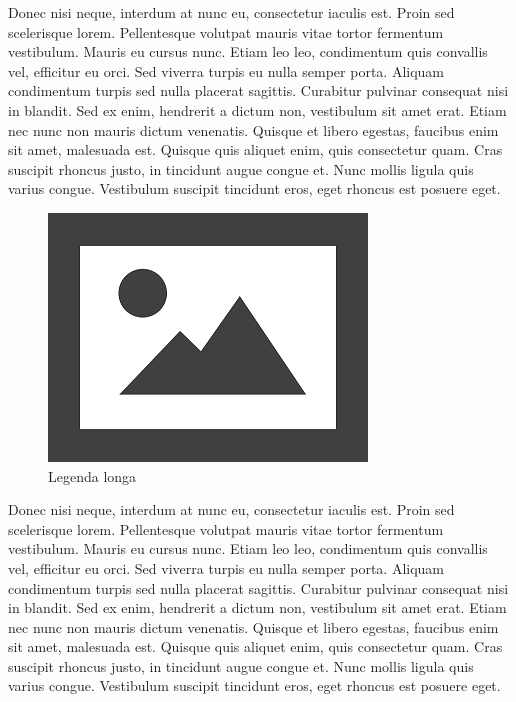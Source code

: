 \documentclass[12pt]{article}
\begin{document}
Donec nisi neque, interdum at nunc eu, consectetur iaculis est. Proin sed scelerisque lorem. Pellentesque volutpat mauris vitae tortor fermentum vestibulum. Mauris eu cursus nunc. Etiam leo leo, condimentum quis convallis vel, efficitur eu orci. Sed viverra turpis eu nulla semper porta. Aliquam condimentum turpis sed nulla placerat sagittis. Curabitur pulvinar consequat nisi in blandit. Sed ex enim, hendrerit a dictum non, vestibulum sit amet erat. Etiam nec nunc non mauris dictum venenatis. Quisque et libero egestas, faucibus enim sit amet, malesuada est. Quisque quis aliquet enim, quis consectetur quam. Cras suscipit rhoncus justo, in tincidunt augue congue et. Nunc mollis ligula quis varius congue. Vestibulum suscipit tincidunt eros, eget rhoncus est posuere eget.

\begin{figure}[H]
	\centering
	\includegraphics[width=0.7\linewidth]{Figuras/fig2}
	\caption[Legenda curta]{Legenda longa}
	\label{fig:figura genérica}
\end{figure}


Donec nisi neque, interdum at nunc eu, consectetur iaculis est. Proin sed scelerisque lorem. Pellentesque volutpat mauris vitae tortor fermentum vestibulum. Mauris eu cursus nunc. Etiam leo leo, condimentum quis convallis vel, efficitur eu orci. Sed viverra turpis eu nulla semper porta. Aliquam condimentum turpis sed nulla placerat sagittis. Curabitur pulvinar consequat nisi in blandit. Sed ex enim, hendrerit a dictum non, vestibulum sit amet erat. Etiam nec nunc non mauris dictum venenatis. Quisque et libero egestas, faucibus enim sit amet, malesuada est. Quisque quis aliquet enim, quis consectetur quam. Cras suscipit rhoncus justo, in tincidunt augue congue et. Nunc mollis ligula quis varius congue. Vestibulum suscipit tincidunt eros, eget rhoncus est posuere eget.
\end{document}
